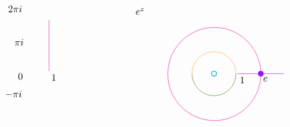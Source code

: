 \documentclass[12pt]{article}
\begin{document}
\[\begin{tikzpicture}[x=0.75pt,y=0.75pt,yscale=-1,xscale=1]
    \draw [shift={(371.35,134.06)}, rotate = 0] [color=cyan  ,draw opacity=1 ][line width=0.75]      (0, 0) circle [x radius= 3.35, y radius= 3.35]   ;
    \draw [color={rgb, 255:red, 144; green, 19; blue, 254 }  ,draw opacity=1 ]   (435.35,134.06) -- (467.35,134.06) ;
    \draw [shift={(435.35,134.06)}, rotate = 0] [color={rgb, 255:red, 144; green, 19; blue, 254 }  ,draw opacity=1 ][fill={rgb, 255:red, 144; green, 19; blue, 254 }  ,fill opacity=1 ][line width=0.75]      (0, 0) circle [x radius= 3.35, y radius= 3.35]   ;
    \draw [color={rgb, 255:red, 144; green, 19; blue, 254 }  ,draw opacity=1 ]   (403.35,134.06) -- (435.35,134.06) ;
    \draw  [draw opacity=0] (341.35,134.06) .. controls (341.35,134.06) and (341.35,134.06) .. (341.35,134.06) .. controls (341.35,117.49) and (354.78,104.06) .. (371.35,104.06) .. controls (387.92,104.06) and (401.35,117.49) .. (401.35,134.06) .. controls (401.35,134.06) and (401.35,134.06) .. (401.35,134.06) -- (371.35,134.06) -- cycle ; \draw [color={rgb, 255:red, 245; green, 166; blue, 35 }  ,draw opacity=1 ]   (341.35,134.06) .. controls (341.35,117.49) and (354.78,104.06) .. (371.35,104.06) .. controls (387.92,104.06) and (401.35,117.49) .. (401.35,134.06) ;  
    \draw  [draw opacity=0] (401.35,134.06) .. controls (401.35,134.06) and (401.35,134.06) .. (401.35,134.06) .. controls (401.35,150.63) and (387.92,164.06) .. (371.35,164.06) .. controls (354.78,164.06) and (341.35,150.63) .. (341.35,134.06) .. controls (341.35,134.06) and (341.35,134.06) .. (341.35,134.06) -- (371.35,134.06) -- cycle ; \draw [color={rgb, 255:red, 65; green, 117; blue, 5 }  ,draw opacity=1 ]   (401.35,134.06) .. controls (401.35,150.63) and (387.92,164.06) .. (371.35,164.06) .. controls (354.78,164.06) and (341.35,150.63) .. (341.35,134.06) ;  
    \draw [color=magenta  ,draw opacity=1 ]   (145.63,60.46) -- (145.63,130.39) ;
    \draw  [color=magenta  ,draw opacity=1 ] (308.15,134.46) .. controls (308.15,99.34) and (336.63,70.86) .. (371.75,70.86) .. controls (406.88,70.86) and (435.35,99.34) .. (435.35,134.46) .. controls (435.35,169.59) and (406.88,198.06) .. (371.75,198.06) .. controls (336.63,198.06) and (308.15,169.59) .. (308.15,134.46) -- cycle ;
    
    \draw (102,132.4) node [anchor=north west][inner sep=0.75pt]    {$0$};
    \draw (147.63,133.79) node [anchor=north west][inner sep=0.75pt]    {$1$};
    \draw (88.4,40) node [anchor=north west][inner sep=0.75pt]    {$2\pi i$};
    \draw (97.2,85.6) node [anchor=north west][inner sep=0.75pt]    {$\pi i$};
    \draw (84.4,156) node [anchor=north west][inner sep=0.75pt]    {$-\pi i$};
    \draw (262.8,43.4) node [anchor=north west][inner sep=0.75pt]    {$e^{z}$};
    \draw (405.35,137.46) node [anchor=north west][inner sep=0.75pt]    {$1$};
    \draw (437.35,137.46) node [anchor=north west][inner sep=0.75pt]    {$e$};
    

\end{tikzpicture}\]
\end{document}
